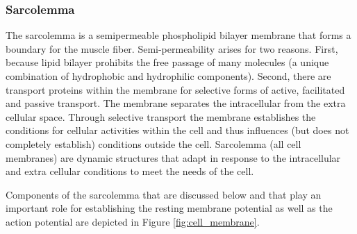 \subsubsection{Sarcolemma}


The sarcolemma is a semipermeable phospholipid bilayer membrane that forms a boundary for the muscle fiber. Semi-permeability arises for two reasons. First, because lipid bilayer prohibits the free passage of many molecules (a unique combination of hydrophobic and hydrophilic components). Second, there are transport proteins within the membrane for selective forms of active, facilitated and passive transport.\footnotemark{} The membrane separates the intracellular from the extra cellular space. Through selective transport the membrane establishes the conditions for cellular activities within the cell and thus influences (but does not completely establish) conditions outside the cell. Sarcolemma (all cell membranes) are dynamic structures that adapt in response to the intracellular and extra cellular conditions to meet the needs of the cell.

Components of the sarcolemma that are discussed below and that play an important role for establishing the resting membrane potential as well as the action potential are depicted in Figure \ref{fig:cell_membrane}. 

